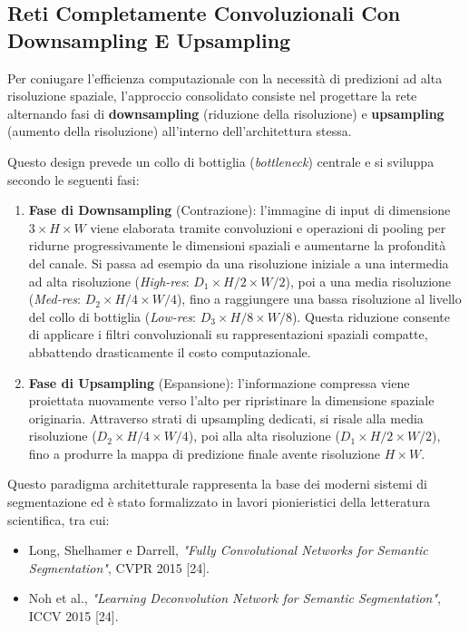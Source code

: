 ﻿\documentclass[11pt, a4paper]{article}
\begin{document}
\subsection{Reti Completamente Convoluzionali Con Downsampling E Upsampling}

Per coniugare l'efficienza computazionale con la necessità di predizioni ad alta risoluzione spaziale, l'approccio consolidato consiste nel progettare la rete alternando fasi di \textbf{downsampling} (riduzione della risoluzione) e \textbf{upsampling} (aumento della risoluzione) all'interno dell'architettura stessa.


Questo design prevede un collo di bottiglia (\emph{bottleneck}) centrale e si sviluppa secondo le seguenti fasi:
\begin{enumerate}
    \item \textbf{Fase di Downsampling} (Contrazione): l'immagine di input di dimensione $3 \times H \times W$ viene elaborata tramite convoluzioni e operazioni di pooling per ridurne progressivamente le dimensioni spaziali e aumentarne la profondità del canale. Si passa ad esempio da una risoluzione iniziale a una intermedia ad alta risoluzione (\emph{High-res}: $D_1 \times H/2 \times W/2$), poi a una media risoluzione (\emph{Med-res}: $D_2 \times H/4 \times W/4$), fino a raggiungere una bassa risoluzione al livello del collo di bottiglia (\emph{Low-res}: $D_3 \times H/8 \times W/8$). Questa riduzione consente di applicare i filtri convoluzionali su rappresentazioni spaziali compatte, abbattendo drasticamente il costo computazionale.
    \item \textbf{Fase di Upsampling} (Espansione): l'informazione compressa viene proiettata nuovamente verso l'alto per ripristinare la dimensione spaziale originaria. Attraverso strati di upsampling dedicati, si risale alla media risoluzione ($D_2 \times H/4 \times W/4$), poi alla alta risoluzione ($D_1 \times H/2 \times W/2$), fino a produrre la mappa di predizione finale avente risoluzione $H \times W$.
\end{enumerate}

Questo paradigma architetturale rappresenta la base dei moderni sistemi di segmentazione ed è stato formalizzato in lavori pionieristici della letteratura scientifica, tra cui:
\begin{itemize}
    \item Long, Shelhamer e Darrell, \emph{"Fully Convolutional Networks for Semantic Segmentation"}, CVPR 2015 [24].
    \item Noh et al., \emph{"Learning Deconvolution Network for Semantic Segmentation"}, ICCV 2015 [24].
\end{itemize}
\end{document}
